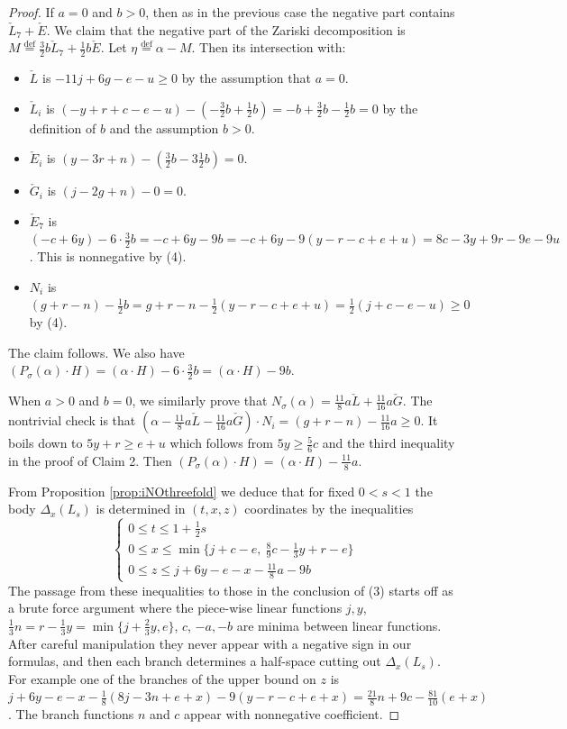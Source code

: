 \documentclass[12pt]{amsart}
\theoremstyle{definition}
\renewcommand{\geq}{\geqslant}
\renewcommand{\leq}{\leqslant}
\newcommand{\deq}{\ensuremath{\stackrel{\textrm{def}}{=}}}
\newcommand{\inob}[2]{\ensuremath{{\Delta}_{#1}(#2)}}
\newcommand{\?}{ \circled{{\large\bf ?}}}
\begin{document}
\begin{proof}
If $a=0$ and $b>0$, then as in the previous case the negative part contains $\check L_7+\check E$. We claim that the negative part of the Zariski decomposition is $M\deq\frac 32b\check L_7+\frac 12b\check E$. 
Let $\eta\deq\alpha-M$. Then its intersection with:
\begin{itemize}
	\item $\check L$ is $-11j+6g-e-u\geq 0$ by the assumption that $a=0$.
	\item $\check L_i$ is $(-y+r+c-e-u)-(-\frac 32b+\frac 12b)=-b+\frac 32b-\frac 12b=0$ by the definition of $b$ and the assumption $b>0$.
	\item $\check E_i$ is $(y-3r+n)-(\frac 32b-3\frac 12b)=0$.
	\item $\check G_i$ is $(j-2g+n)-0=0$.
	\item $\check E_7$ is $(-c+6y)-6\cdot\frac 32b=-c+6y-9b=-c+6y-9(y-r-c+e+u)=8c-3y+9r-9e-9u$. This is nonnegative by (4).
	\item $N_i$ is $(g+r-n)-\frac 12b=g+r-n-\frac 12(y-r-c+e+u)=\frac 12(j+c-e-u)\geq 0$ by (4). 
\end{itemize}
The claim follows. We also have $(P_{\sigma}(\alpha)\cdot H)=(\alpha\cdot H)-6\cdot\frac 32b=(\alpha\cdot H)-9b$.


When $a>0$ and $b=0$, we similarly prove that $N_{\sigma}(\alpha)=\frac{11}8a\check L+\frac{11}{16}a\check G$.
The nontrivial check is that $(\alpha-\frac{11}8a\check L-\frac{11}{16}a\check G)\cdot N_i=(g+r-n)-\frac{11}{16}a\geq0$. It boils down to $5y+r\geq e+u$ which follows from $5y\geq\frac 56c$ and the third inequality in the proof of Claim 2. Then $(P_{\sigma}(\alpha)\cdot H)=(\alpha\cdot H)-\frac{11}8a$.
\smallskip

From Proposition \ref{prop:iNOthreefold} we deduce that for fixed $0<s<1$ the body $\inob{x}{L_s}$ is determined in $(t,x,z)$ coordinates by the inequalities
\[\begin{cases}
	0\leq t\leq 1+\frac 12s\\
	0\leq x\leq \min\{j+c-e,\ \frac 89c-\frac 13y+r-e\}\\
	0\leq z\leq j+6y-e-x-\frac{11}8a-9b
\end{cases}\]
The passage from these inequalities to those in the conclusion of (3) starts off as a brute force argument where the piece-wise linear functions $j,y$, $\frac 13 n= r-\frac 13y=\min\{j+\frac 23y,e\}$, $c$, $-a,-b$ are minima between linear functions. After careful manipulation they never appear with a negative sign in our formulas, and then each branch determines a half-space cutting out $\inob{x}{L_s}$. For example one of the branches of the upper bound on $z$ is $j+6y-e-x-\frac{1}8(8j-3n+e+x)-9(y-r-c+e+x)=\frac{21}8n+9c-\frac{81}{10}(e+x)$. The branch functions $n$ and $c$ appear with nonnegative coefficient.


\end{proof}
\end{document}
